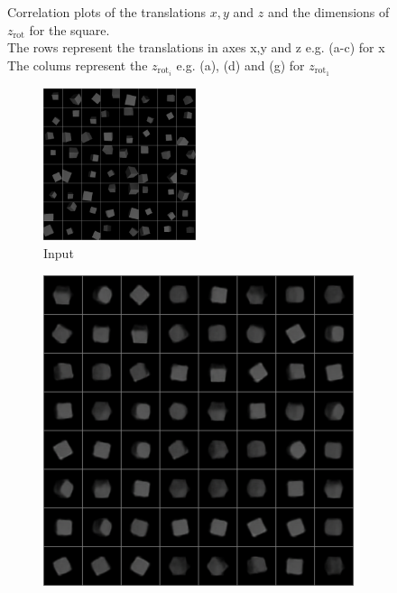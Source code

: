 \documentclass[10pt,a4paper]{article}
\newcommand{\rot}{\ensuremath{\text{rot}\xspace}}
\begin{document}
\begin{figure}[!ht]
\begin{subfigure}{0.3\textwidth}
        \caption{}
        \label{fig_zz2}
    \end{subfigure}
    \caption{Correlation plots of the translations $x,y$ and $z$ and the dimensions of $z_{\rot}$ for the square.\\
        The rows represent the translations in axes x,y and z e.g. (a-c) for x\\
    The colums represent the $z_{\rot_i}$ e.g. (a), (d) and (g) for $z_{\rot_1}$} \label{Square_corr_trans}
\end{figure}


\begin{figure}[!ht]
    \centering
    \begin{subfigure}{\textwidth}
        \centering
        \includegraphics[width=0.49\textwidth] {cube_input.png}
        \caption{Input}
        \label{cube_in}
    \end{subfigure}
    \begin{subfigure}{0.49\textwidth}
        \centering
        \includegraphics[width=\textwidth] {cube_output0.png}

\end{subfigure}
\end{figure}
\end{document}
